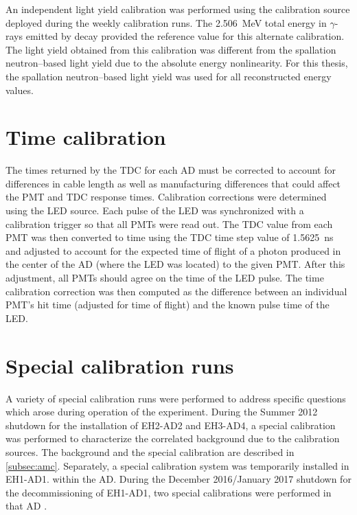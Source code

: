 An independent light yield calibration was performed
using the  calibration source
deployed during the weekly calibration runs.
The \SI{2.506}{\MeV} total energy in $\gamma$-rays emitted by  decay
provided the reference value for this alternate calibration.
The light yield obtained from this calibration
was different from the spallation neutron--based light yield
due to the absolute energy nonlinearity.
For this thesis, the spallation neutron--based light yield was used
for all reconstructed energy values.

\section{Time calibration}
\label{sec:time_calib}

The times returned by the TDC for each AD must be corrected
to account for differences in cable length as well as
manufacturing differences that could affect the PMT and TDC response times.
Calibration corrections were determined using the LED source.
Each pulse of the LED was synchronized with a calibration trigger so that all PMTs were read out.
The TDC value from each PMT was then converted to time using the
TDC time step value of \SI{1.5625}{\ns} and adjusted
to account for the expected time of flight
of a photon produced in the center of the AD (where the LED was located)
to the given PMT.
After this adjustment, all PMTs should agree on the time of the LED pulse.
The time calibration correction was then computed
as the difference between an individual PMT's hit time
(adjusted for time of flight)
and the known pulse time of the LED.

\section{Special calibration runs}
\label{sec:special_calib}

A variety of special calibration runs were performed
to address specific questions which arose during operation of the experiment.
During the Summer 2012 shutdown for the installation of EH2-AD2 and EH3-AD4,
a special calibration was performed to characterize the correlated background
due to the \amc{} calibration sources.
The \amc{} background and the special calibration are described in \cref{subsec:amc}.
Separately, a special calibration system was temporarily installed in EH1-AD1.
within the AD.
During the December 2016/January 2017 shutdown for the decommissioning of EH1-AD1,
two special calibrations were performed in that AD \cite{calib_proposal2017}.

